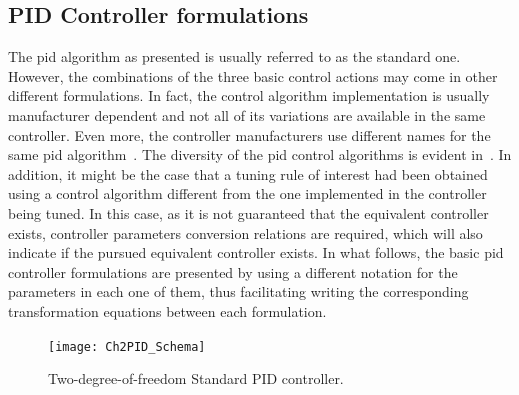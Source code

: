 \subsection{PID Controller formulations}
\label{sec:3.1}
The \gls{pid} algorithm as presented is usually referred to as the standard one. However, the combinations of the three basic control actions may come in other different formulations. In fact, the control algorithm implementation is usually manufacturer dependent and not all of its variations are available in the same controller. Even more, the controller manufacturers use different names for the same \gls{pid} algorithm~\citep{gerry1987, vilanova2017WEE}. The diversity of the \gls{pid} control algorithms is evident in~\citet{odwyer2006}.  In addition, it might be the case that a tuning rule of interest had been obtained using a control algorithm different from the one implemented in the controller being tuned. In this case, as it is not guaranteed that the equivalent controller exists, controller parameters conversion relations are required, which will also indicate if the pursued equivalent controller exists. In what follows, the basic \gls{pid} controller formulations are presented by using a different notation for the parameters in each one of them, thus facilitating writing the corresponding transformation equations between each formulation. %
%
\begin{figure}[tb]
\centering
\texttt{[image: Ch2PID\_Schema]} 
\caption{Two-degree-of-freedom Standard PID controller.} 
\label{Ch2fig:PID_Schema}
\end{figure}
%
